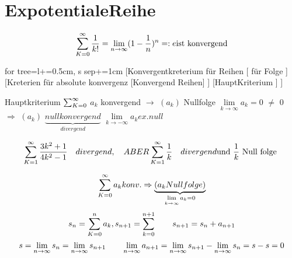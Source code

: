 \section{ExpotentialeReihe}

\[ \sum_{K=0}^{\infty} \frac{1}{k!} = \lim\limits_{n \rightarrow \infty} ( 1-\frac{1}{n})^n =:e \text{ist konvergend} \]

	\begin{forest}
	for tree={l+=0.5cm, s sep+=1cm}
	[Konvergentkreterium für Reihen 
	[	für Folge ]
	[Kreterien für absolute konvergenz [Konvergend Reihen] ]
	[HauptKriterium ]
	]
	\end{forest}

			Hauptkriterium $\sum_{K=0}^{\infty}$ $a_k$ konvergend $\rightarrow$ $(a_k)$ Nullfolge
			$\lim\limits_{k \rightarrow \infty} a_k=0$ $\neq$ $0$ $\Rightarrow$ $(a_k)$  	$\underbrace{null konvergend }_{divergend}$
			$\lim\limits_{k \rightarrow -\infty} a_k ex.null$

						\begin{example}
						
						\[ \sum_{K=1}^{\infty} \frac{3k^2+1}{4k^2-1} \quad divergend, \quad ABER \sum_{K=1}^{\infty} \frac{1}{k} \quad divergend \text{und $\frac{1}{k}$ Null folge }  \]
						

						\end{example}
\begin{example}
\[  \sum_{K=0}^{\infty} a_k konv. \Rightarrow \underbrace{(a_k Nullfolge) }_{\lim\limits_{k \rightarrow \infty} a_k=0}  \] 
\[s_n =\sum_{K=0}^{n} a_k , s_{n+1} =\sum_{k=0}^{n+1} \qquad s_{n+1}=s_n + a_{n+1} \]
\[s= \lim\limits_{n \rightarrow \infty} s_n= \lim\limits_{n \rightarrow \infty} s_{n+1} \qquad \lim\limits_{n \rightarrow \infty} a_{n+1} = \lim\limits_{n \rightarrow \infty} s_{n+1} - \lim\limits_{n \rightarrow \infty} s_n = s-s=0 \]
\end{example}
